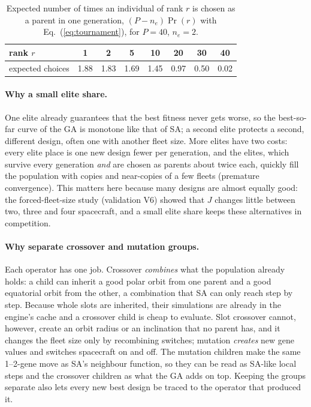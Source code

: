 \begin{table}[htbp]
\centering
\caption{Expected number of times an individual of rank $r$ is chosen as a parent in one
generation, $(P-n_e)\Pr(r)$ with Eq.~(\ref{eq:tournament}), for $P=40$, $n_e=2$.}
\label{tab:tournament}
\begin{tabular}{@{}lccccccc@{}}
\toprule
rank $r$ & 1 & 2 & 5 & 10 & 20 & 30 & 40 \\
\midrule
expected choices & 1.88 & 1.83 & 1.69 & 1.45 & 0.97 & 0.50 & 0.02 \\
\bottomrule
\end{tabular}
\end{table}

\paragraph{Why a small elite share.} One elite already guarantees that the best fitness never
gets worse, so the best-so-far curve of the \ac{GA} is monotone like that of \ac{SA}; a second
elite protects a second, different design, often one with another fleet size. More elites have
two costs: every elite place is one new design fewer per generation, and the elites, which
survive every generation \emph{and} are chosen as parents about twice each, quickly fill the
population with copies and near-copies of a few fleets (premature convergence). This matters here
because many designs are almost equally good: the forced-fleet-size study (validation V6) showed
that $J$ changes little between two, three and four spacecraft, and a small elite share keeps these
alternatives in competition.

\paragraph{Why separate crossover and mutation groups.} Each operator has one job. Crossover
\emph{combines} what the population already holds: a child can inherit a good polar orbit from one
parent and a good equatorial orbit from the other, a combination that \ac{SA} can only reach step
by step. Because whole slots are inherited, their simulations are already in the engine's cache and
a crossover child is cheap to evaluate. Slot crossover cannot, however, create an orbit radius or an
inclination that no parent has, and it changes the fleet size only by recombining switches;
mutation \emph{creates} new gene values and switches spacecraft on and off. The mutation children
make the same 1--2-gene move as \ac{SA}'s neighbour function, so they can be read as \ac{SA}-like
local steps and the crossover children as what the \ac{GA} adds on top. Keeping the groups separate
also lets every new best design be traced to the operator that produced it.

